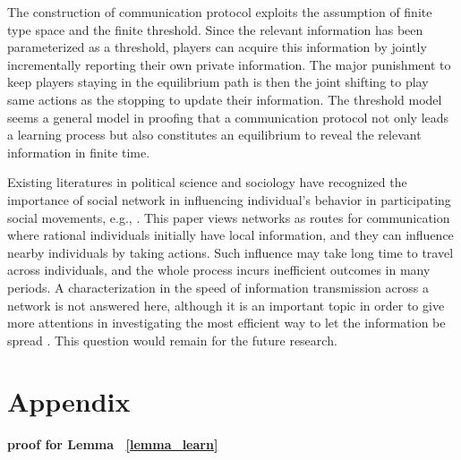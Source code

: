 \documentclass[12pt,letter]{article}
\theoremstyle{definition}
\theoremstyle{remark}
\theoremstyle{claim}
\begin{document}
The construction of communication protocol exploits the assumption of finite type space and the finite threshold. Since the relevant information has been parameterized as a threshold, players can acquire this information by jointly incrementally reporting their own private information. The major punishment to keep players staying in the equilibrium path is then the joint shifting to play same actions as the stopping to update their information. The threshold model seems a general model in proofing that a communication protocol not only leads a learning process but also constitutes an equilibrium to reveal the relevant information in finite time.

Existing literatures in political science and sociology have recognized the importance of social network in influencing individual's behavior in participating social movements, e.g., \citep{Passy2003}\citep{McAdam2003}\citep{Siegel2009}. This paper views networks as routes for communication where rational individuals initially have local information, and they can influence nearby individuals by taking actions. Such influence may take long time to travel across individuals, and the whole process incurs inefficient outcomes in many periods. A characterization in the speed of information transmission across a network is not answered here, although it is an important topic in order to give more attentions in investigating the most efficient way to let the information be spread . This question would remain for the future research.





\appendix
\section{Appendix}
\label{appx_network}
\noindent\textbf{proof for Lemma ~\ref{lemma_learn}}
\end{document}
